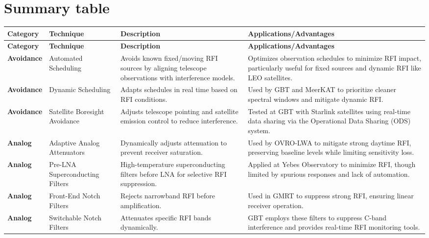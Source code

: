 \section{Summary table} %
\label{section:hardware:summary}


\begin{longtable}{|p{3cm}|p{4cm}|p{5cm}|p{5cm}|}
\hline
\textbf{Category} & \textbf{Technique} & \textbf{Description} & \textbf{Applications/Advantages} \\
\hline
\endfirsthead
\hline
\textbf{Category} & \textbf{Technique} & \textbf{Description} & \textbf{Applications/Advantages} \\
\hline
\endhead
\hline
\endfoot

\textbf{Avoidance} & Automated Scheduling & Avoids known fixed/moving RFI sources by aligning telescope observations with interference models. & Optimizes observation schedules to minimize RFI impact, particularly useful for fixed sources and dynamic RFI like LEO satellites. \\
\hline
\textbf{Avoidance} & Dynamic Scheduling & Adapts schedules in real time based on RFI conditions. & Used by GBT and MeerKAT to prioritize cleaner spectral windows and mitigate dynamic RFI. \\
\hline
\textbf{Avoidance} & Satellite Boresight Avoidance & Adjusts telescope pointing and satellite emission control to reduce interference. & Tested at GBT with Starlink satellites using real-time data sharing via the Operational Data Sharing (ODS) system. \\
\hline
\textbf{Analog} & Adaptive Analog Attenuators & Dynamically adjusts attenuation to prevent receiver saturation. & Used by OVRO-LWA to mitigate strong daytime RFI, preserving baseline levels while limiting sensitivity loss. \\
\hline
\textbf{Analog} & Pre-LNA Superconducting Filters & High-temperature superconducting filters before LNA for selective RFI suppression. & Applied at Yebes Observatory to minimize RFI, though limited by spurious responses and lack of automation. \\
\hline
\textbf{Analog} & Front-End Notch Filters & Rejects narrowband RFI before amplification. & Used in GMRT to suppress strong RFI, ensuring linear receiver operation. \\
\hline
\textbf{Analog} & Switchable Notch Filters & Attenuates specific RFI bands dynamically. & GBT employs these filters to suppress C-band interference and provides real-time RFI monitoring tools. \\

\end{longtable}
